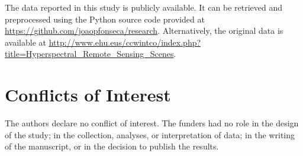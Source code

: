 \documentclass[preprint,12pt]{elsarticle}
\begin{document}
The data reported in this study is publicly available. It can be retrieved and
preprocessed using the Python source code provided at
\url{https://github.com/joaopfonseca/research}. Alternatively, the original
data is available at
\url{http://www.ehu.eus/ccwintco/index.php?title=Hyperspectral_Remote_Sensing_Scenes}.


\section{Conflicts of Interest}

The authors declare no conflict of interest. The funders had no role in the
design of the study; in the collection, analyses, or interpretation of data;
in the writing of the manuscript, or in the decision to publish the results.



\end{document}
